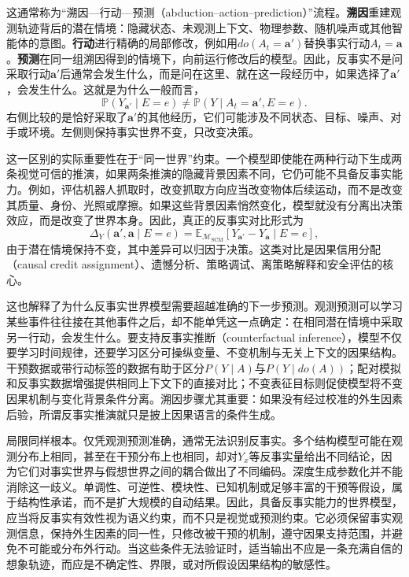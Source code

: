 这通常称为“溯因—行动—预测（abduction--action--prediction）”流程。\textbf{溯因}重建观测轨迹背后的潜在情境：隐藏状态、未观测上下文、物理参数、随机噪声或其他智能体的意图。\textbf{行动}进行精确的局部修改，例如用\(do(A_t=\mathbf{a}')\)替换事实行动\(A_t=\mathbf{a}\)。\textbf{预测}在同一组溯因得到的情境下，向前运行修改后的模型。因此，反事实不是问采取行动\(\mathbf{a}'\)后通常会发生什么，而是问在这里、就在这一段经历中，如果选择了\(\mathbf{a}'\)，会发生什么。这就是为什么一般而言，
\begin{equation}
    \mathbb{P}(Y_{\mathbf{a}'}\mid E=e)
    \neq
    \mathbb{P}(Y\mid A_t=\mathbf{a}',E=e).
\end{equation}
右侧比较的是恰好采取了\(\mathbf{a}'\)的其他经历，它们可能涉及不同状态、目标、噪声、对手或环境。左侧则保持事实世界不变，只改变决策\citep{pearl2009causality,pawlowski2020deep}。

这一区别的实际重要性在于“同一世界”约束。一个模型即使能在两种行动下生成两条视觉可信的推演，如果两条推演的隐藏背景因素不同，它仍可能不具备反事实能力。例如，评估机器人抓取时，改变抓取方向应当改变物体后续运动，而不是改变其质量、身份、光照或摩擦。如果这些背景因素悄然变化，模型就没有分离出决策效应，而是改变了世界本身。因此，真正的反事实对比形式为
\begin{equation}
    \Delta_Y(\mathbf{a}',\mathbf{a}\mid E=e)
    =
    \mathbb{E}_{\mathcal{M}_{\mathrm{SCM}}}
    \left[
    Y_{\mathbf{a}'}-Y_{\mathbf{a}}
    \mid E=e
    \right],
\end{equation}
由于潜在情境保持不变，其中差异可以归因于决策。这类对比是因果信用分配（causal credit assignment）、遗憾分析、策略调试、离策略解释和安全评估的核心。

这也解释了为什么反事实世界模型需要超越准确的下一步预测。观测预测可以学习某些事件往往接在其他事件之后，却不能单凭这一点确定：在相同潜在情境中采取另一行动，会发生什么。要支持反事实推断（counterfactual inference），模型不仅要学习时间规律，还要学习区分可操纵变量、不变机制与无关上下文的因果结构。干预数据或带行动标签的数据有助于区分\(P(Y\mid A)\)与\(P(Y\mid do(A))\)；配对模拟和反事实数据增强提供相同上下文下的直接对比；不变表征目标则促使模型将不变因果机制与变化背景条件分离\citep{scholkopf2021toward,pitis2022mocoda,richens2024robust,gupta2024essential}。溯因步骤尤其重要：如果没有经过校准的外生因素后验，所谓反事实推演就只是披上因果语言的条件生成。

局限同样根本。仅凭观测预测准确，通常无法识别反事实。多个结构模型可能在观测分布上相同，甚至在干预分布上也相同，却对\(Y_x\)等反事实量给出不同结论，因为它们对事实世界与假想世界之间的耦合做出了不同编码。深度生成参数化并不能消除这一歧义。单调性、可逆性、模块性、已知机制或足够丰富的干预等假设，属于结构性承诺，而不是扩大规模的自动结果\citep{bareinboim2022pearl,nasr2023counterfactual}。因此，具备反事实能力的世界模型，应当将反事实有效性视为语义约束，而不只是视觉或预测约束。它必须保留事实观测信息，保持外生因素的同一性，只修改被干预的机制，遵守因果支持范围，并避免不可能或分布外行动。当这些条件无法验证时，适当输出不应是一条充满自信的想象轨迹，而应是不确定性、界限，或对所假设因果结构的敏感性。

